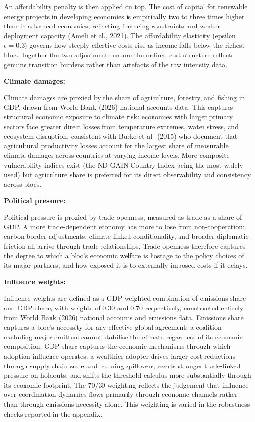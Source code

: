\documentclass[10pt,a4paper]{article}
\newcommand{\bpar}[1]{\medskip\noindent\textbf{#1}\par}
\begin{document}
An affordability penalty is then applied on top. The cost of capital for renewable energy projects in
developing economies is empirically two to three times higher than in advanced economies, reflecting
financing constraints and weaker deployment capacity (Ameli et al., 2021). The affordability elasticity
(epsilon $\epsilon = 0.3$) governs how steeply effective costs rise as income falls below the richest bloc. Together
the two adjustments ensure the ordinal cost structure reflects genuine transition burdens rather than
artefacts of the raw intensity data.

\bpar{Climate damages:}
Climate damages are proxied by the share of agriculture, forestry, and fishing in GDP,
drawn from World Bank (2026) national accounts data. This captures structural economic exposure to
climate risk: economies with larger primary sectors face greater direct losses from temperature extremes,
water stress, and ecosystem disruption, consistent with Burke et al.\ (2015) who document that agricultural
productivity losses account for the largest share of measurable climate damages across countries at
varying income levels. More composite vulnerability indices exist (the ND-GAIN Country Index being
the most widely used) but agriculture share is preferred for its direct observability and consistency
across blocs.

\needspace{5em}
\bpar{Political pressure:}
Political pressure is proxied by trade openness, measured as trade as a share of GDP.
A more trade-dependent economy has more to lose from non-cooperation: carbon border adjustments,
climate-linked conditionality, and broader diplomatic friction all arrive through trade relationships. Trade
openness therefore captures the degree to which a bloc's economic welfare is hostage to the policy
choices of its major partners, and how exposed it is to externally imposed costs if it delays.

\bpar{Influence weights:}
Influence weights are defined as a GDP-weighted combination of emissions share and
GDP share, with weights of 0.30 and 0.70 respectively, constructed entirely from World Bank (2026)
national accounts and emissions data. Emissions share captures a bloc's necessity for any effective global
agreement: a coalition excluding major emitters cannot stabilise the climate regardless of its economic
composition. GDP share captures the economic mechanisms through which adoption influence operates: a
wealthier adopter drives larger cost reductions through supply chain scale and learning spillovers, exerts
stronger trade-linked pressure on holdouts, and shifts the threshold calculus more substantially through
its economic footprint. The 70/30 weighting reflects the judgement that influence over coordination
dynamics flows primarily through economic channels rather than through emissions necessity alone. This
weighting is varied in the robustness checks reported in the appendix.
\end{document}
